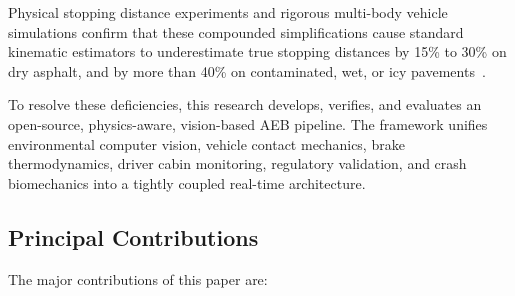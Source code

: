 \documentclass[3p,twocolumn]{elsarticle}
\begin{document}
Physical stopping distance experiments and rigorous multi-body vehicle simulations confirm that these compounded simplifications cause standard kinematic estimators to underestimate true stopping distances by 15\% to 30\% on dry asphalt, and by more than 40\% on contaminated, wet, or icy pavements~\cite{iso21994,seiniger2012}.

To resolve these deficiencies, this research develops, verifies, and evaluates an open-source, physics-aware, vision-based AEB pipeline. The framework unifies environmental computer vision, vehicle contact mechanics, brake thermodynamics, driver cabin monitoring, regulatory validation, and crash biomechanics into a tightly coupled real-time architecture.

\subsection{Principal Contributions}
The major contributions of this paper are:
\end{document}
